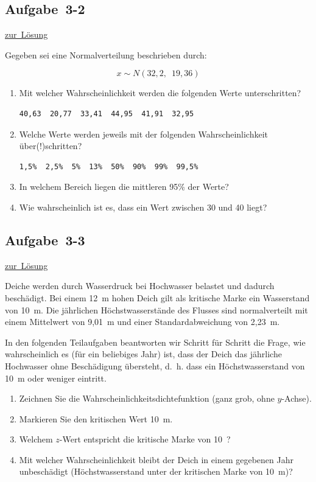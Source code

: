 \documentclass[
  11pt,
  ngerman,
  a4paper,
]{report}
\providecommand{\tightlist}{%
  \setlength{\itemsep}{0pt}\setlength{\parskip}{0pt}}
\begin{document}
\hypertarget{aufgabe-3-2}{%
\subsection{Aufgabe~3-2}\label{aufgabe-3-2}}

\protect\hyperlink{loesung-3-2}{zur~Lösung}

Gegeben sei eine Normalverteilung beschrieben durch:

\[x \sim N(32{,}2,\enspace19{,}36)\]

\begin{enumerate}
\def\labelenumi{\alph{enumi})}
\item
  Mit welcher Wahrscheinlichkeit werden die folgenden Werte unterschritten?

\begin{verbatim}
40,63  20,77  33,41  44,95  41,91  32,95
\end{verbatim}
\item
  Welche Werte werden jeweils mit der folgenden Wahrscheinlichkeit über(!)schritten?

\begin{verbatim}
1,5%  2,5%  5%  13%  50%  90%  99%  99,5%
\end{verbatim}
\item
  In welchem Bereich liegen die mittleren 95\% der Werte?
\item
  Wie wahrscheinlich ist es, dass ein Wert zwischen 30 und 40 liegt?
\end{enumerate}

\hypertarget{aufgabe-3-3}{%
\subsection{Aufgabe~3-3}\label{aufgabe-3-3}}

\protect\hyperlink{loesung-3-3}{zur~Lösung}

Deiche werden durch Wasserdruck bei Hochwasser belastet und dadurch beschädigt. Bei einem 12~m hohen Deich gilt als kritische Marke ein Wasserstand von 10~m. Die jährlichen Höchstwasserstände des Flusses sind normalverteilt mit einem Mittelwert von 9,01~m und einer Standardabweichung von 2,23~m.

In den folgenden Teilaufgaben beantworten wir Schritt für Schritt die Frage, wie wahrscheinlich es (für ein beliebiges Jahr) ist, dass der Deich das jährliche Hochwasser ohne Beschädigung übersteht, d.~h. dass ein Höchstwasserstand von 10~m oder weniger eintritt.

\begin{enumerate}
\def\labelenumi{\alph{enumi})}
\tightlist
\item
  Zeichnen Sie die Wahrscheinlichkeitsdichtefunktion (ganz grob, ohne \(y\)-Achse).
\item
  Markieren Sie den kritischen Wert 10~m.
\item
  Welchem \(z\)-Wert entspricht die kritische Marke von 10~?
\item
  Mit welcher Wahrscheinlichkeit bleibt der Deich in einem gegebenen Jahr unbeschädigt (Höchstwasserstand unter der kritischen Marke von 10~m)?
\end{enumerate}
\end{document}
